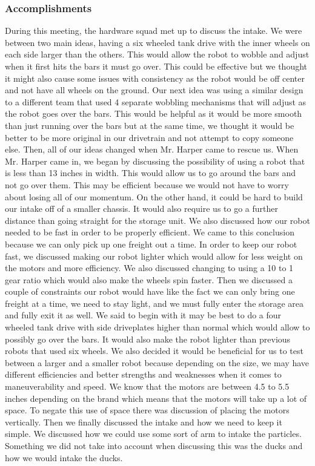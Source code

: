 \subsubsection*{Accomplishments}
During this meeting, the hardware squad met up to discuss the intake. We were between two main ideas, having a six wheeled tank drive with the inner wheels on each side larger than the others. This would allow the robot to wobble and adjust when it first hits the bars it must go over. This could be effective but we thought it might also cause some issues with consistency as the robot would be off center and not have all wheels on the ground. Our next idea was using a similar design to a different team that used 4 separate wobbling mechanisms that will adjust as the robot goes over the bars. This would be helpful as it would be more smooth than just running over the bars but at the same time, we thought it would be better to be more original in our drivetrain and not attempt to copy someone else. Then, all of our ideas changed when Mr. Harper came to rescue us. When Mr. Harper came in, we began by discussing the possibility of using a robot that is less than 13 inches in width. This would allow us to go around the bars and not go over them. This may be efficient because we would not have to worry about losing all of our momentum. On the other hand, it could be hard to build our intake off of a smaller chassis. It would also require us to go a further distance than going straight for the storage unit. We also discussed how our robot needed to be fast in order to be properly efficient. We came to this conclusion because we can only pick up one freight out a time. In order to keep our robot fast, we discussed making our robot lighter which would allow for less weight on the motors and more efficiency. We also discussed changing to using a 10 to 1 gear ratio which would also make the wheels spin faster. Then we discussed a couple of constraints our robot would have like the fact we can only bring one freight at a time, we need to stay light, and we must fully enter the storage area and fully exit it as well. We said to begin with it may be best to do a four wheeled tank drive with side driveplates higher than normal which would allow to possibly go over the bars. It would also make the robot lighter than previous robots that used six wheels. We also decided it would be beneficial for us to test between a larger and a smaller robot because depending on the size, we may have different efficiencies and better strengths and weaknesses when it comes to maneuverability and speed. We know that the motors are between 4.5 to 5.5 inches depending on the brand which means that the motors will take up a lot of space. To negate this use of space there was discussion of placing the motors vertically. Then we finally discussed the intake and how we need to keep it simple. We discussed how we could use some sort of arm to intake the particles. Something we did not take into account when discussing this was the ducks and how we would intake the ducks.

